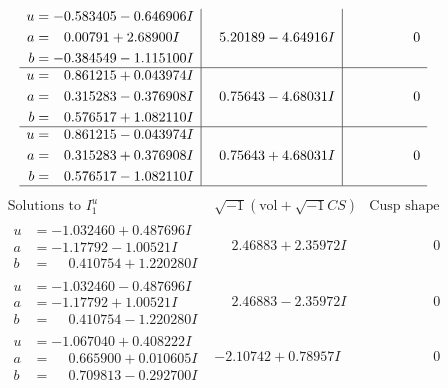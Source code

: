 \documentclass[1p]{elsarticle_modified}
\theoremstyle{definition}
\newcommand{\I}{\sqrt{-1}}
\begin{document}
$$\begin{array}{c|c|c}
\begin{aligned}
u &= -0.583405 - 0.646906 I \\
a &= \phantom{-}0.00791 + 2.68900 I \\
b &= -0.384549 - 1.115100 I\end{aligned}
 & \phantom{-}5.20189 - 4.64916 I & \phantom{-0.000000 } 0 \\ \hline\begin{aligned}
u &= \phantom{-}0.861215 + 0.043974 I \\
a &= \phantom{-}0.315283 - 0.376908 I \\
b &= \phantom{-}0.576517 + 1.082110 I\end{aligned}
 & \phantom{-}0.75643 - 4.68031 I & \phantom{-0.000000 } 0 \\ \hline\begin{aligned}
u &= \phantom{-}0.861215 - 0.043974 I \\
a &= \phantom{-}0.315283 + 0.376908 I \\
b &= \phantom{-}0.576517 - 1.082110 I\end{aligned}
 & \phantom{-}0.75643 + 4.68031 I & \phantom{-0.000000 } 0\\
 \hline 
 \end{array}$$\newpage$$\begin{array}{c|c|c}  
\text{Solutions to }I^u_{1}& \I (\text{vol} + \sqrt{-1}CS) & \text{Cusp shape}\\
 \hline 
\begin{aligned}
u &= -1.032460 + 0.487696 I \\
a &= -1.17792 - 1.00521 I \\
b &= \phantom{-}0.410754 + 1.220280 I\end{aligned}
 & \phantom{-}2.46883 + 2.35972 I & \phantom{-0.000000 } 0 \\ \hline\begin{aligned}
u &= -1.032460 - 0.487696 I \\
a &= -1.17792 + 1.00521 I \\
b &= \phantom{-}0.410754 - 1.220280 I\end{aligned}
 & \phantom{-}2.46883 - 2.35972 I & \phantom{-0.000000 } 0 \\ \hline\begin{aligned}
u &= -1.067040 + 0.408222 I \\
a &= \phantom{-}0.665900 + 0.010605 I \\
b &= \phantom{-}0.709813 - 0.292700 I\end{aligned}
 & -2.10742 + 0.78957 I & \phantom{-0.000000 } 0 \\ \hline\begin{aligned}

\end{aligned}
\end{array}$$
\end{document}
